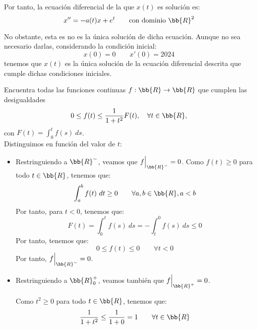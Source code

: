\documentclass[12pt]{article}
\begin{document}
\begin{ejercicio}
        Por tanto, la ecuación diferencial de la que $x(t)$ es solución es:
        \begin{equation*}
            x''=-a(t)x+e^t\qquad \text{con dominio }\bb{R}^2
        \end{equation*}

        No obstante, esta es no es la única solución de dicha ecuación. Aunque no sea necesario darlas, considerando la condición inicial:
        \begin{equation*}
            x(0)=0\qquad x'(0)=2024
        \end{equation*}
        tenemos que $x(t)$ es la única solución de la ecuación diferencial descrita que cumple dichas condiciones iniciales.
    \end{ejercicio}

    \begin{ejercicio}
        Encuentra todas las funciones continuas $f: \bb{R} \to \bb{R}$ que cumplen las desigualdades
        \begin{equation*}
            0 \leq f(t) \leq \dfrac{1}{1 + t^2}F(t), \quad \forall t \in \bb{R},
        \end{equation*}
        con $F(t) = \int_0^t f(s)~ds$.\\

        Distinguimos en función del valor de $t$:
        \begin{itemize}
            \item Restringuiendo a $\bb{R}^-$, veamos que $f\Big|_{\bb{R}^-}=0$.
            Como $f(t)\geq 0$ para todo $t\in \bb{R}$, tenemos que:
            \begin{equation*}
                \int_a^b f(t)~dt\geq 0\qquad \forall a,b\in \bb{R}, a<b
            \end{equation*}
            Por tanto, para $t<0$, tenemos que:
            \begin{equation*}
                F(t)=\int_0^t f(s)~ds=-\int_t^0 f(s)~ds\leq 0
            \end{equation*}
            Por tanto, tenemos que:
            \begin{equation*}
                0\leq f(t)\leq 0\qquad \forall t<0
            \end{equation*}
            Por tanto, $f\Big|_{\bb{R}^-}=0$.

            \item Restringuiendo a $\bb{R}^+_0$, veamos también que $f\Big|_{\bb{R}^+}=0$.
            
            Como $t^2\geq 0$ para todo $t\in \bb{R}$, tenemos que:
            \begin{equation*}
                \dfrac{1}{1+t^2}\leq \dfrac{1}{1+0} = 1\qquad \forall t\in \bb{R}
            \end{equation*}


\end{itemize}
\end{ejercicio}
\end{document}
